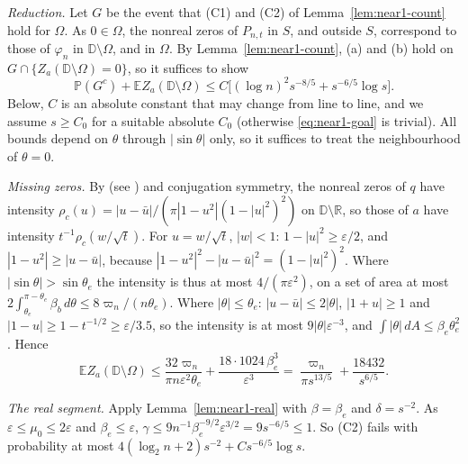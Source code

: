 \documentclass[11pt]{amsart}
\theoremstyle{definition}
\theoremstyle{remark}
\numberwithin{equation}{section}
\newcommand{\R}{\mathbb{R}}
\newcommand{\D}{\mathbb{D}}
\newcommand{\E}{\mathbb{E}}
\newcommand{\PP}{\mathbb{P}}
\newcommand{\eps}{\varepsilon}
\begin{document}
\emph{Reduction.} Let $G$ be the event that (C1) and (C2) of Lemma~\ref{lem:near1-count} hold for $\Omega$. As $0\in\Omega$, the nonreal zeros of $P_{n,t}$ in $S$, and outside $S$, correspond to those of $\varphi_n$ in $\D\setminus\Omega$, and in $\Omega$. By Lemma~\ref{lem:near1-count}, (a) and (b) hold on $G\cap\{Z_a(\D\setminus\Omega)=0\}$, so it suffices to show
\begin{equation}\label{eq:near1-goal}
\PP(G^c)+\E Z_a(\D\setminus\Omega)\le C\bigl[(\log n)^2s^{-8/5}+s^{-6/5}\log s\bigr].
\end{equation}
Below, $C$ is an absolute constant that may change from line to line, and we assume $s\ge C_0$ for a suitable absolute $C_0$ (otherwise \eqref{eq:near1-goal} is trivial). All bounds depend on $\theta$ through $|\sin\theta|$ only, so it suffices to treat the neighbourhood of $\theta=0$.

\emph{Missing zeros.} By \cite[Theorem~2.7]{MS} (see \cite[Lemma~\ref{M-lem:pairs}]{Main}) and conjugation symmetry, the nonreal zeros of $q$ have intensity $\rho_c(u)=|u-\bar u|/(\pi|1-u^2|(1-|u|^2)^2)$ on $\D\setminus\R$, so those of $a$ have intensity $t^{-1}\rho_c(w/\sqrt t)$. For $u=w/\sqrt t$, $|w|<1$: $1-|u|^2\ge\eps/2$, and $|1-u^2|\ge|u-\bar u|$, because $|1-u^2|^2-|u-\bar u|^2=(1-|u|^2)^2$. Where $|\sin\theta|>\sin\theta_e$ the intensity is thus at most $4/(\pi\eps^2)$, on a set of area at most $2\int_{\theta_e}^{\pi-\theta_e}\beta_b\,d\theta\le8\varpi_n/(n\theta_e)$. Where $|\theta|\le\theta_e$: $|u-\bar u|\le2|\theta|$, $|1+u|\ge1$ and $|1-u|\ge1-t^{-1/2}\ge\eps/3.5$, so the intensity is at most $9|\theta|\eps^{-3}$, and $\int|\theta|\,dA\le\beta_e\theta_e^2$. Hence
\[
\E Z_a(\D\setminus\Omega)\le\frac{32\varpi_n}{\pi n\eps^2\theta_e}+\frac{18\cdot1024\,\beta_e^3}{\eps^3}=\frac{\varpi_n}{\pi s^{13/5}}+\frac{18432}{s^{6/5}}.
\]

\emph{The real segment.} Apply Lemma~\ref{lem:near1-real} with $\beta=\beta_e$ and $\delta=s^{-2}$. As $\eps\le\mu_0\le2\eps$ and $\beta_e\le\eps$, $\gamma\le9n^{-1}\beta_e^{-9/2}\eps^{3/2}=9s^{-6/5}\le1$. So (C2) fails with probability at most $4(\log_2n+2)s^{-2}+Cs^{-6/5}\log s$.
\end{document}
